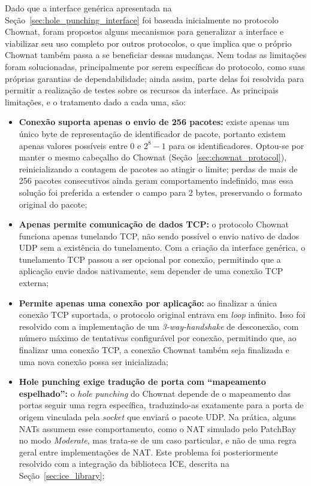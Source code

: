 Dado que a interface genérica apresentada na Seção~\ref{sec:hole_punching_interface} foi baseada inicialmente no protocolo Chownat, foram propostos alguns mecanismos para generalizar a interface e viabilizar seu uso completo por outros protocolos, o que implica que o próprio Chownat também passa a se beneficiar dessas mudanças. Nem todas as limitações foram solucionadas, principalmente por serem específicas do protocolo, como suas próprias garantias de dependabilidade; ainda assim, parte delas foi resolvida para permitir a realização de testes sobre os recursos da interface. As principais limitações, e o tratamento dado a cada uma, são:

\begin{itemize}
    \item \textbf{Conexão suporta apenas o envio de 256 pacotes:} existe apenas um único byte de representação de identificador de pacote, portanto existem apenas valores possíveis entre 0 e $2^8-1$ para os identificadores. Optou-se por manter o mesmo cabeçalho do Chownat (Seção~\ref{sec:chownat_protocol}), reinicializando a contagem de pacotes ao atingir o limite; perdas de mais de 256 pacotes consecutivos ainda geram comportamento indefinido, mas essa solução foi preferida a estender o campo para 2 bytes, preservando o formato original do pacote;
    \item \textbf{Apenas permite comunicação de dados TCP:} o protocolo Chownat funciona apenas tunelando TCP, não sendo possível o envio nativo de dados UDP sem a existência do tunelamento. Com a criação da interface genérica, o tunelamento TCP passou a ser opcional por conexão, permitindo que a aplicação envie dados nativamente, sem depender de uma conexão TCP externa;
    \item \textbf{Permite apenas uma conexão por aplicação:} ao finalizar a única conexão TCP suportada, o protocolo original entrava em \textit{loop} infinito. Isso foi resolvido com a implementação de um \textit{3-way-handshake} de desconexão, com número máximo de tentativas configurável por conexão, permitindo que, ao finalizar uma conexão TCP, a conexão Chownat também seja finalizada e uma nova conexão possa ser inicializada;
    \item \textbf{Hole punching exige tradução de porta com ``mapeamento espelhado'':} o \textit{hole punching} do Chownat depende de o mapeamento das portas seguir uma regra específica, traduzindo-as exatamente para a porta de origem vinculada pela \textit{socket} que enviará o pacote UDP. Na prática, alguns NATs assumem esse comportamento, como o NAT simulado pelo PatchBay \citep{patchbay} no modo \textit{Moderate}, mas trata-se de um caso particular, e não de uma regra geral entre implementações de NAT. Este problema foi posteriormente resolvido com a integração da biblioteca ICE, descrita na Seção~\ref{sec:ice_library};

\end{itemize}
